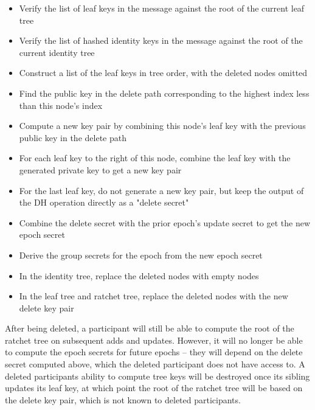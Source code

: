 \documentclass[11pt, oneside]{article}
\begin{document}
\begin{itemize}
\item{Verify the list of leaf keys in the message against the root of the current leaf tree}
\item{Verify the list of hashed identity keys in the message against the root of the current identity tree}
\item{Construct a list of the leaf keys in tree order, with the deleted nodes omitted}
\item{Find the public key in the delete path corresponding to the highest index less than this node's index}
\item{Compute a new key pair by combining this node's leaf key with the previous public key in the delete path}
\item{For each leaf key to the right of this node, combine the leaf key with the generated private key to get a new key pair}
\item{For the last leaf key, do not generate a new key pair, but keep the output of the DH operation directly as a "delete secret"}
\item{Combine the delete secret with the prior epoch's update secret to get the new epoch secret}
\item{Derive the group secrets for the epoch from the new epoch secret}
\item{In the identity tree, replace the deleted nodes with empty nodes}
\item{In the leaf tree and ratchet tree, replace the deleted nodes with the new delete key pair}
\end{itemize}

After being deleted, a participant will still be able to compute the root of the ratchet tree on subsequent adds and updates.  However, it will no longer be able to compute the epoch secrets for future epochs -- they will depend on the delete secret computed above, which the deleted participant does not have access to.  A deleted participants ability to compute tree keys will be destroyed once its sibling updates its leaf key, at which point the root of the ratchet tree will be based on the delete key pair, which is not known to deleted participants.
\end{document}
